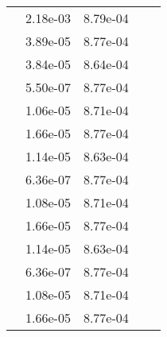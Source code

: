 \begin{table}
\begin{tabular}{c|cc|cc|}
\multicolumn{1}{|c|}{} & \multicolumn{1}{|c|}{  2.18e-03} & \multicolumn{1}{|c|}{  8.79e-04} & \multicolumn{1}{|c|}{} & \multicolumn{1}{|c|}{} \\ 
\multicolumn{1}{|c|}{} & \multicolumn{1}{|c|}{  3.89e-05} & \multicolumn{1}{|c|}{  8.77e-04} & \multicolumn{1}{|c|}{} & \multicolumn{1}{|c|}{} \\ 
\multicolumn{1}{|c|}{} & \multicolumn{1}{|c|}{  3.84e-05} & \multicolumn{1}{|c|}{  8.64e-04} & \multicolumn{1}{|c|}{} & \multicolumn{1}{|c|}{} \\ 
\multicolumn{1}{|c|}{} & \multicolumn{1}{|c|}{  5.50e-07} & \multicolumn{1}{|c|}{  8.77e-04} & \multicolumn{1}{|c|}{} & \multicolumn{1}{|c|}{} \\ 
\multicolumn{1}{|c|}{} & \multicolumn{1}{|c|}{  1.06e-05} & \multicolumn{1}{|c|}{  8.71e-04} & \multicolumn{1}{|c|}{} & \multicolumn{1}{|c|}{} \\ 
\multicolumn{1}{|c|}{} & \multicolumn{1}{|c|}{  1.66e-05} & \multicolumn{1}{|c|}{  8.77e-04} & \multicolumn{1}{|c|}{} & \multicolumn{1}{|c|}{} \\ 
\multicolumn{1}{|c|}{} & \multicolumn{1}{|c|}{  1.14e-05} & \multicolumn{1}{|c|}{  8.63e-04} & \multicolumn{1}{|c|}{} & \multicolumn{1}{|c|}{} \\ 
\multicolumn{1}{|c|}{} & \multicolumn{1}{|c|}{  6.36e-07} & \multicolumn{1}{|c|}{  8.77e-04} & \multicolumn{1}{|c|}{} & \multicolumn{1}{|c|}{} \\ 
\multicolumn{1}{|c|}{} & \multicolumn{1}{|c|}{  1.08e-05} & \multicolumn{1}{|c|}{  8.71e-04} & \multicolumn{1}{|c|}{} & \multicolumn{1}{|c|}{} \\ 
\multicolumn{1}{|c|}{} & \multicolumn{1}{|c|}{  1.66e-05} & \multicolumn{1}{|c|}{  8.77e-04} & \multicolumn{1}{|c|}{} & \multicolumn{1}{|c|}{} \\ 
\multicolumn{1}{|c|}{} & \multicolumn{1}{|c|}{  1.14e-05} & \multicolumn{1}{|c|}{  8.63e-04} & \multicolumn{1}{|c|}{} & \multicolumn{1}{|c|}{} \\ 
\multicolumn{1}{|c|}{} & \multicolumn{1}{|c|}{  6.36e-07} & \multicolumn{1}{|c|}{  8.77e-04} & \multicolumn{1}{|c|}{} & \multicolumn{1}{|c|}{} \\ 
\multicolumn{1}{|c|}{} & \multicolumn{1}{|c|}{  1.08e-05} & \multicolumn{1}{|c|}{  8.71e-04} & \multicolumn{1}{|c|}{} & \multicolumn{1}{|c|}{} \\ 
\multicolumn{1}{|c|}{} & \multicolumn{1}{|c|}{  1.66e-05} & \multicolumn{1}{|c|}{  8.77e-04} & \multicolumn{1}{|c|}{} & \multicolumn{1}{|c|}{} \\ 

\end{tabular}
\end{table}
